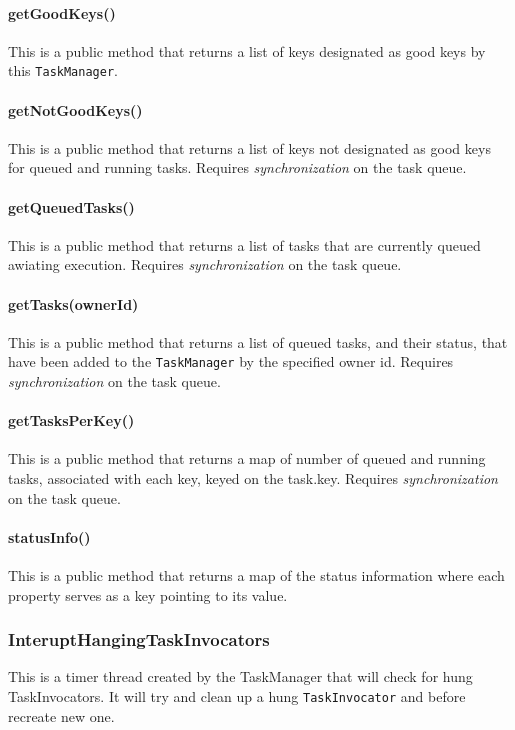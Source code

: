 \paragraph{getGoodKeys()}
This is a public method that returns a list of keys designated as good keys by 
this \texttt{TaskManager}.

\paragraph{getNotGoodKeys()}
This is a public method that returns a list of keys not designated as good keys 
for queued and running tasks. Requires \emph{synchronization} on the task queue.

\paragraph{getQueuedTasks()}
This is a public method that returns a list of tasks that are currently queued 
awiating execution. Requires \emph{synchronization} on the task queue.

\paragraph{getTasks(ownerId)}
This is a public method that returns a list of queued tasks, and their status, 
that have been added to the \texttt{TaskManager} by the specified owner id. 
Requires \emph{synchronization} on the task queue.

\paragraph{getTasksPerKey()}
This is a public method that returns a map of number of queued and running 
tasks, associated with each key, keyed on the task.key. Requires 
\emph{synchronization} on the task queue.

\paragraph{statusInfo()}
This is a public method that returns a map of the status information where each 
property serves as a key pointing to its value.


\subsubsection{InteruptHangingTaskInvocators}
This is a timer thread created by the TaskManager that will check for hung 
TaskInvocators. It will try and clean up a hung \texttt{TaskInvocator} and 
before recreate new one.


